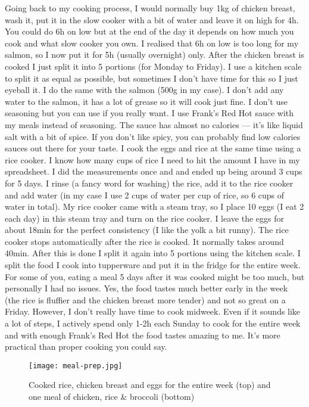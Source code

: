\documentclass[openany, 12pt]{book}
\begin{document}
        Going back to my cooking process, I would normally buy 1kg of chicken breast, wash it, put it in the slow cooker with a bit of water and leave it on high for 4h.
        You could do 6h on low but at the end of the day it depends on how much you cook and what slow cooker you own. I realised that 6h on low is too long for my salmon,
        so I now put it for 5h (usually overnight) only. After the chicken breast is cooked I just
        split it into 5 portions (for Monday to Friday). I use a kitchen scale to split it as equal as possible, but sometimes I don't have time for this so I just eyeball it.
        I do the same with the salmon (500g in my case). I don't add any water to the salmon, it has a lot of grease so it will cook just fine. I don't use seasoning but you
        can use if you really want. I use Frank's Red Hot sauce with my meals instead of seasoning.
        The sauce has almost no calories --- it's like liquid salt with a bit of spice. If you don't like spicy, you can probably find low calories sauces out there for your
        taste. I cook the eggs and rice at the same time using a rice cooker. I know how many cups of rice I need to hit the amount I have in my spreadsheet. I did the
        measurements once and and ended up being around 3 cups for 5 days. I rinse (a fancy word for washing) the rice, add it to the rice cooker and add water (in my case I use
        2 cups of water per cup of rice, so 6 cups of water in total). My rice cooker came with a steam tray, so I place 10 eggs (I eat 2 each day) in this steam tray and turn on
        the rice cooker. I leave the eggs for about 18min for the perfect consistency (I like the yolk a bit runny). The rice cooker stops automatically after the rice is cooked.
        It normally takes around 40min. After this is done I split it again into 5 portions using the kitchen scale. I split the food I cook into tupperware and put it in the
        fridge for the entire week. For some of you, eating a meal 5 days after it was cooked might be too much, but personally I had no issues. Yes, the food tastes much better
        early in the week (the rice is fluffier and the chicken breast more tender) and not so great on a Friday. However, I don't really have time to cook midweek. Even if it
        sounds like a lot of steps, I actively spend only 1-2h each Sunday to cook for the entire week and with enough Frank's Red Hot the food tastes amazing to me. It's more
        practical than proper cooking you could say.

	\begin{figure}[h]
		\centering
		\texttt{[image: meal-prep.jpg]}
		\caption{Cooked rice, chicken breast and eggs for the entire week (top) and one meal of chicken, rice \& broccoli (bottom)}
		\label{fig5}
	\end{figure}
\end{document}
